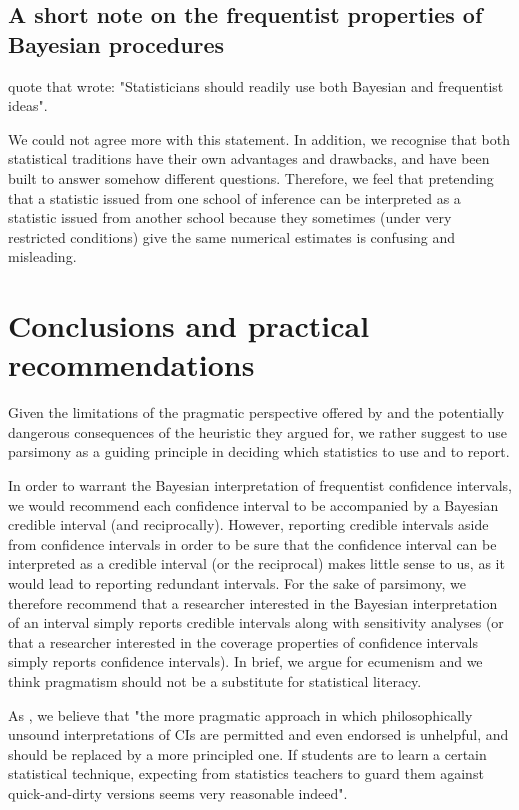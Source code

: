 \documentclass[a4paper,man,natbib,floatsintext,donotrepeattitle]{apa6}
\begin{document}
\subsection{A short note on the frequentist properties of Bayesian procedures}

\cite{albers_credible_2018} quote \cite{bayarri_interplay_2004} that wrote: "Statisticians should readily use both Bayesian and frequentist ideas".

We could not agree more with this statement. In addition, we recognise that both statistical traditions have their own advantages and drawbacks, and have been built to answer somehow different questions. Therefore, we feel that pretending that a statistic issued from one school of inference can be interpreted as a statistic issued from another school because they sometimes (under very restricted conditions) give the same numerical estimates is confusing and misleading.

\section{Conclusions and practical recommendations}

Given the limitations of the pragmatic perspective offered by \cite{albers_credible_2018} and the potentially dangerous consequences of the heuristic they argued for, we rather suggest to use parsimony as a guiding principle in deciding which statistics to use and to report.

In order to warrant the Bayesian interpretation of frequentist confidence intervals, we would recommend each confidence interval to be accompanied by a Bayesian credible interval (and reciprocally). However, reporting credible intervals aside from confidence intervals in order to be sure that the confidence interval can be interpreted as a credible interval (or the reciprocal) makes little sense to us, as it would lead to reporting redundant intervals. For the sake of parsimony, we therefore recommend that a researcher interested in the Bayesian interpretation of an interval simply reports credible intervals along with sensitivity analyses (or that a researcher interested in the coverage properties of confidence intervals simply reports confidence intervals). In brief, we argue for ecumenism and we think pragmatism should not be a substitute for statistical literacy. 

As \cite{hoekstra_improving_2018}, we believe that "the more pragmatic approach in which philosophically unsound interpretations of CIs are permitted and even endorsed is unhelpful, and should be replaced by a more principled one. If students are to learn a certain statistical technique, expecting from statistics teachers to guard them against quick-and-dirty versions seems very reasonable indeed".
\end{document}
